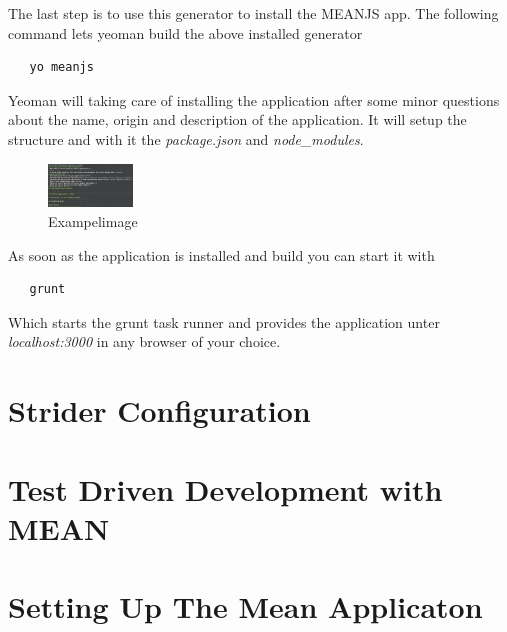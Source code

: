 The last step is to use this generator to install the MEANJS app. The following command lets yeoman build the above installed generator

\begin{lstlisting}
   yo meanjs
\end{lstlisting}

Yeoman will taking care of installing the application after some minor questions about the name, origin and description of the application.
It will setup the structure and with it the \textit{package.json} and \textit{node_modules}.

\begin{figure}[h!]
  \centering
      \includegraphics[width=0.2\textwidth]{images/yomean.png}
  \caption{Exampelimage}
\end{figure}

As soon as the application is installed and build you can start it with

\begin{lstlisting}
   grunt
\end{lstlisting}

Which starts the grunt task runner and provides the application unter \textit{localhost:3000} in any browser of your choice.




\section{Strider Configuration}
\label{section:Strider Configuration}


\section{Test Driven Development with MEAN}
\label{section:Test Driven Development with MEAN}


\newpage

\section{Setting Up The Mean Applicaton}
\label{section:Containerization and Deployment with Docker}


\newpage

